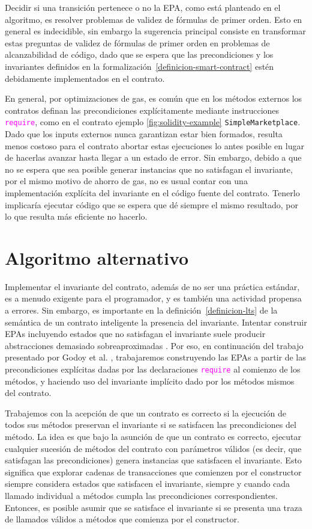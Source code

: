 Decidir si una transición pertenece o no la EPA, como está planteado en el algoritmo, es resolver problemas de validez de fórmulas de primer orden.
Esto en general es indecidible, sin embargo la sugerencia principal consiste en transformar estas preguntas de validez de fórmulas de primer orden en problemas de alcanzabilidad de código, dado que se espera que las precondiciones y los invariantes definidos en la formalización~\ref{definicion-smart-contract} estén debidamente implementados en el contrato.

En general, por optimizaciones de gas, es común que en los métodos externos los contratos definan las precondiciones explícitamente mediante instrucciones \textcolor{magenta}{\texttt{require}}, como en el contrato ejemplo \ref{fig:solidity-example} \texttt{SimpleMarketplace}.
Dado que los inputs externos nunca garantizan estar bien formados, resulta menos costoso para el contrato abortar estas ejecuciones lo antes posible en lugar de hacerlas avanzar hasta llegar a un estado de error.
Sin embargo, debido a que no se espera que sea posible generar instancias que no satisfagan el invariante, por el mismo motivo de ahorro de gas, no es usual contar con una implementación explícita del invariante en el código fuente del contrato.
Tenerlo implicaría ejecutar código que se espera que dé siempre el mismo resultado, por lo que resulta más eficiente no hacerlo.

\section{Algoritmo alternativo}
\label{sec:algoritmo-aternativo}
Implementar el invariante del contrato, además de no ser una práctica estándar, es a menudo exigente para el programador, y es también una actividad propensa a errores.
Sin embargo, es importante en la definición~\ref{definicion-lts} de la semántica de un contrato inteligente la  presencia del invariante.
Intentar construir EPAs incluyendo estados que no satisfagan el invariante suele producir abstracciones demasiado sobreaproximadas \cite{de-caso-epa}.
Por eso, en continuación del trabajo presentado por Godoy et al. \cite{predicate-abstraction-for-smart-contract-validation}, trabajaremos construyendo las EPAs a partir de las precondiciones explícitas dadas por las declaraciones \textcolor{magenta}{\texttt{require}} al comienzo de los métodos, y haciendo uso  del invariante implícito dado por los métodos mismos del contrato.

Trabajemos con la acepción de que un contrato es correcto si la ejecución de todos sus métodos preservan el invariante si se satisfacen las precondiciones del método.
La idea es que bajo la asunción de que un contrato es correcto, ejecutar cualquier sucesión de métodos del contrato con parámetros válidos (es decir, que satisfagan las precondiciones) genera instancias que satisfacen el invariante.
Esto significa que explorar cadenas de transacciones que comienzen por el constructor siempre considera estados que satisfacen el invariante, siempre y cuando cada llamado individual a métodos cumpla las precondiciones correspondientes.
Entonces, es posible asumir que se satisface el invariante si se presenta una traza de llamados válidos a métodos que comienza por el constructor.

